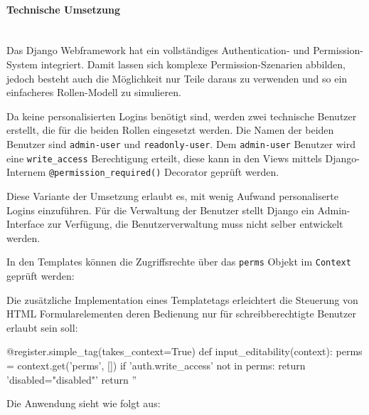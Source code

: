 \paragraph{Technische Umsetzung} \hspace{0pt} \\
Das Django Webframework hat ein vollständiges Authentication- und
Permission-System integriert. Damit lassen sich komplexe Permission-Szenarien
abbilden, jedoch besteht auch die Möglichkeit nur Teile daraus zu verwenden und
so ein einfacheres Rollen-Modell zu simulieren.

Da keine personalisierten Logins benötigt sind, werden zwei technische Benutzer
erstellt, die für die beiden Rollen eingesetzt werden. Die Namen der beiden Benutzer sind 
 \texttt{admin-user} und \texttt{readonly-user}. Dem
\texttt{admin-user} Benutzer wird eine \texttt{write\_access} Berechtigung erteilt, diese
kann in den Views mittels Django-Internem \texttt{@permission\_required()}
Decorator geprüft werden.

Diese Variante der Umsetzung erlaubt es, mit wenig Aufwand personaliserte Logins
einzuführen. Für die Verwaltung der Benutzer stellt Django ein Admin-Interface
zur Verfügung, die Benutzerverwaltung muss nicht selber entwickelt werden.

In den Templates können die Zugriffsrechte über das \texttt{perms} Objekt im
\texttt{Context} geprüft werden:


Die zusätzliche Implementation eines Templatetags erleichtert die Steuerung von HTML Formularelementen deren Bedienung nur für schreibberechtigte Benutzer erlaubt sein soll:

\begin{pythoncode}
@register.simple_tag(takes_context=True)
def input_editability(context):
    perms = context.get('perms', [])
    if 'auth.write_access' not in perms:
        return 'disabled="disabled"'
    return ''
\end{pythoncode}

Die Anwendung sieht wie folgt aus:


